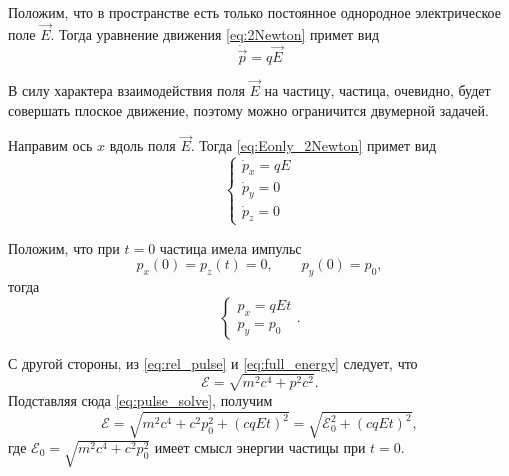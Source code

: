 Положим, что в пространстве есть только постоянное однородное электрическое поле $\vec{E}$. Тогда уравнение движения \eqref{eq:2Newton} примет вид
\begin{equation}
\dot{\vec{p}} = q \vec{E}
\label{eq:Eonly_2Newton}
\end{equation}

В силу характера взаимодействия поля $\vec{E}$ на частицу, частица, очевидно, будет совершать плоское движение, поэтому можно ограничится двумерной задачей. 

Направим ось $x$ вдоль поля $\vec{E}$. Тогда \eqref{eq:Eonly_2Newton} примет вид
\begin{equation*}
\begin{cases}
\dot{p}_x = q E \\
\dot{p}_y = 0 \\
\dot{p}_z = 0
\end{cases}
\end{equation*}

 Положим, что при $t = 0$ частица имела импульс
\begin{equation*}
p_x(0) = p_z(t) = 0, \qquad p_y(0) = p_0,
\end{equation*}
тогда
\begin{equation}
\begin{cases}
p_x = qEt \\
p_y = p_0
\end{cases}.
\label{eq:pulse_solve}
\end{equation}


С другой стороны, из \eqref{eq:rel_pulse} и \eqref{eq:full_energy} следует, что 
\begin{equation}
\mathscr{E} =  \sqrt{m^2 c^4 + p^2c^2}.
\label{eq:energgg}
\end{equation}
Подставляя сюда \eqref{eq:pulse_solve}, получим
\begin{equation}
\mathscr{E} = \sqrt{m^2c^4 + c^2 p_0^2 + (cqEt)^2} = \sqrt{\mathscr{E}_0^2 + (cqEt)^2},
\end{equation}
где $\mathscr{E}_0  = \sqrt{m^2c^4 + c^2 p_0^2}$ имеет смысл энергии частицы при $t =0$.

